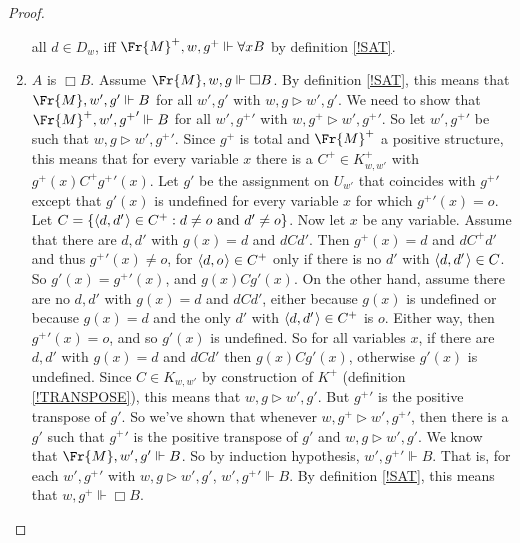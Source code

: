 \documentclass[11pt]{woarticle}
\theoremstyle{break}
\theoremstyle{nonumberplain}
\newcommand{\SAT}{\Vdash}
\newcommand{\Img}{\triangleright}
\newcommand{\1}{\;\,|\;\,}
\renewcommand{\t}[1]{\ensuremath{\langle #1  \makebox[.2ex]{}\rangle}}
\begin{document}
\begin{proof}
\begin{enumerate}
          all $d \in D_{w}$, iff $\Fr{M}^{+},w,g^{+} \SAT \forall x B$ by definition
          \ref{!SAT}.
    \item $A$ is $\Box B$.\; Assume $\Fr{M},w,g \SAT \Box B$. By definition
          \ref{!SAT}, this means that $\Fr{M},w',g' \SAT B$ for all $w',g'$ with
          $w,g \Img w',g'$.
          We need to show that $\Fr{M}^{+},w', {g^+}' \SAT B$ for all
          $w',{g^+}'$ with $w,g^{+} \Img w',{g^{+}}'$. So let $w',{g^+}'$ be
          such that $w,g \Img w',{g^{+}}'$. Since $g^+$ is total and $\Fr{M}^+$
          a positive structure, this means that for every variable $x$ there is
          a $C^+ \in K^+_{w,w'}$ with $g^+(x)C^+{g^+}'(x)$. Let $g'$ be the
          assignment on $U_{w'}$ that coincides with ${g^+}'$ except that
          $g'(x)$ is undefined for every variable $x$ for which
          ${g^+}'(x) = o$. Let $C = \{ \t{d,d'} \in C^{+} : d \not=o \text{ and
          } d'\not=o \}$. Now let $x$ be any variable. Assume that there are $d,d'$ with $g(x)=d$ and $dCd'$.
          Then $g^+(x) = d$ and $dC^+d'$ and thus ${g^+}'(x) \not= o$, for
          $\t{d,o} \in C^+$ only if there is no $d'$ with $\t{d,d'} \in C$. So
          $g'(x) = {g^+}'(x)$, and $g(x)Cg'(x)$. On the other hand, assume there
          are no $d,d'$ with $g(x)=d$ and $dCd'$, either because $g(x)$ is
          undefined or because $g(x)=d$ and the only $d'$ with
          $\t{d,d'} \in C^+$ is $o$. Either way, then ${g^+}'(x) = o$, and so
          $g'(x)$ is undefined. So for all variables $x$, if there are $d,d'$
          with $g(x)=d$ and $dCd'$ then $g(x)Cg'(x)$, otherwise $g'(x)$ is
          undefined. Since $C \in K_{w,w'}$ by construction of $K^+$ (definition
          \ref{!TRANSPOSE}), this means that $w,g \Img w',g'$. But ${g^+}'$ is
          the positive transpose of $g'$. So we've shown that whenever
          $w,g^+ \Img w',{g^+}'$, then there is a $g'$ such that ${g^+}'$ is the
          positive transpose of $g'$ and $w,g \Img w',g'$. We know that
          $\Fr{M},w',g' \SAT B$. So by induction hypothesis, $w',{g^+}' \SAT B$. That
          is, for each $w',{g^+}'$ with $w,g \Img w',g'$, $w',{g^+}' \SAT B$. By
          definition \ref{!SAT}, this means that $w, g^+ \SAT \Box B$.


\end{enumerate}
\end{proof}
\end{document}
